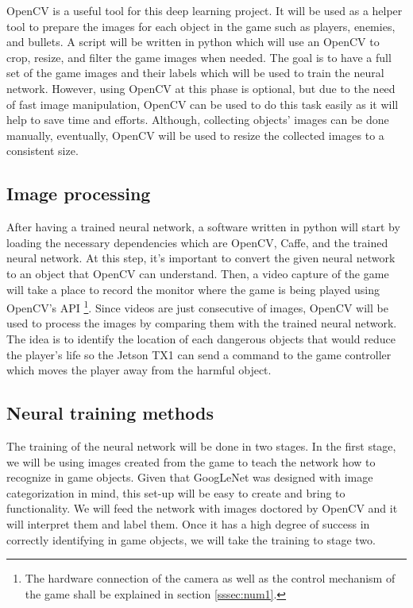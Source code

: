 \documentclass{scrreprt}
\begin{document}
OpenCV is a useful tool for this deep learning project.
It will be used as a helper tool to prepare the images for each object in the game such as players, enemies, and bullets.
A script will be written in python which will use an OpenCV to crop, resize, and filter the game images when needed.
The goal is to have a full set of the game images and their labels which will be used to train the neural network.
However, using OpenCV at this phase is optional, but due to the need of fast image manipulation, OpenCV can be used to do this task easily as it will help to save time and efforts.
Although, collecting objects’ images can be done manually, eventually, OpenCV will be used to resize the collected images to a consistent size.

\subsection{Image processing}%

After having a trained neural network, a software written in python will start by loading the necessary dependencies which are OpenCV, Caffe, and the trained neural network.
At this step, it’s important to convert the given neural network to an object that OpenCV can understand.
Then, a video capture of the game will take a place to record the monitor where the game is being played using OpenCV's API
\footnote{The hardware connection of the camera as well as the control mechanism of the game shall be explained in section \ref{sssec:num1}.}.
Since videos are just consecutive of images, OpenCV will be used to process the images by comparing them with the trained neural network.
The idea is to identify the location of each dangerous objects that would reduce the player's life so the Jetson TX1 can send a command to the game controller which moves the player away from the harmful object.



\subsection{Neural training methods}%

The training of the neural network will be done in two stages.
In the first stage, we will be using images created from the game to teach the network how to recognize in game objects.
Given that GoogLeNet was designed with image categorization in mind, this set-up will be easy to create and bring to functionality.
We will feed the network with images doctored by OpenCV and it will interpret them and label them.
Once it has a high degree of success in correctly identifying in game objects, we will take the training to stage two.
\newline
\end{document}
